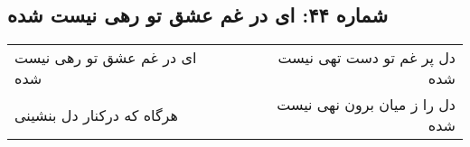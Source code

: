 \begin{center}
\section*{شماره ۴۴: ای در غم عشق تو رهی نیست شده}
\label{sec:044}
\begin{longtable}{l p{0.5cm} r}
ای در غم عشق تو رهی نیست شده
&&
دل پر غم تو دست تهی نیست شده
\\
هرگاه که درکنار دل بنشینی
&&
دل را ز میان برون نهی نیست شده
\\
\end{longtable}
\end{center}
